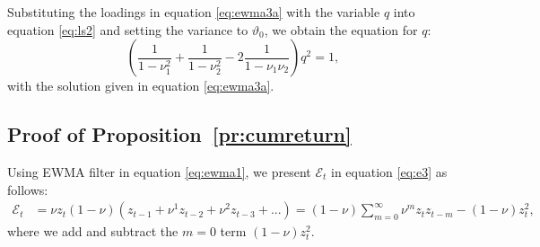 \documentclass[hidelinks]{siamonline250211}
\begin{document}
Substituting the loadings in equation \eqref{eq:ewma3a} with the variable $q$ into equation \eqref{eq:ls2} and setting the variance to $\vartheta_{0}$, we obtain the equation for $q$:
\begin{equation} \label{eq:ls5} 
	\left( \frac{1}{ 1-\nu^{2}_{1}}  + \frac{1}{ 1-\nu^{2}_{2} } - 2 \frac{1}{1-\nu_{1}\nu_{2}} \right)q^{2} = 1,
\end{equation}
with the solution given in equation \eqref{eq:ewma3a}. 





\subsection{Proof of Proposition~\ref{pr:cumreturn}}\label{sec:cumreturn}


Using EWMA filter in equation \eqref{eq:ewma1}, we present $\mathcal{E}_{t}$ in equation \eqref{eq:e3} as follows:
\begin{equation} \label{eq:e3b} 
	\begin{split}
		\mathcal{E}_{t} & =      \nu z_{t}    \left(1-\nu \right)  \left(  z_{t-1} + \nu^{1} z_{t-2} + \nu^{2} z_{t-3}+... \right)   =  \left(1-\nu \right)  \sum^{\infty}_{m=0} \nu^{m} z_{t} z_{t-m} - \left(1-\nu \right)  z^{2}_{t},
	\end{split}
\end{equation}
where we add and subtract the $m=0$ term $\left(1-\nu\right)z^{2}_{t}$.
\end{document}
